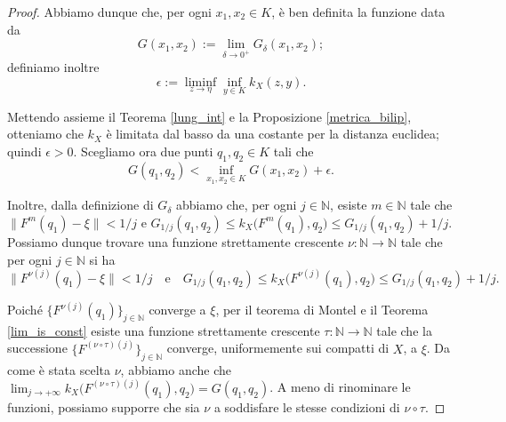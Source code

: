 \begin{proof}
    Abbiamo dunque che, per ogni $x_1,x_2 \in K$, è ben definita la funzione data da
    $$G(x_1,x_2):=\lim_{\delta\longrightarrow 0^+}G_\delta(x_1,x_2);$$
    definiamo inoltre
    $$\epsilon:=\liminf_{z \longrightarrow\eta}\inf_{y\in K}k_X(z,y).$$
    
    Mettendo assieme il Teorema \ref{lung_int} e la Proposizione \ref{metrica_bilip}, otteniamo che $k_X$ è limitata dal basso da una costante per la distanza euclidea; quindi $\epsilon>0$. Scegliamo ora due punti $q_1,q_2 \in K$ tali che
    $$G(q_1,q_2)<\inf_{x_1,x_2\in K}G(x_1,x_2)+\epsilon.$$
    
    Inoltre, dalla definizione di $G_{\delta}$ abbiamo che, per ogni $j\in\mathbb{N}$, esiste $m\in\mathbb{N}$ tale che $\|F^m(q_1)-\xi\|<1/j$ e $G_{1/j}(q_1,q_2) \le k_X\big(F^m(q_1),q_2\big) \le G_{1/j}(q_1,q_2)+1/j$. Possiamo dunque trovare una funzione strettamente crescente $\nu:\mathbb{N}\longrightarrow\mathbb{N}$ tale che per ogni $j\in\mathbb{N}$ si ha
    $$\|F^{\nu(j)}(q_1)-\xi\|<1/j \quad\text{e}\quad G_{1/j}(q_1,q_2) \le k_X\big(F^{\nu(j)}(q_1),q_2\big) \le G_{1/j}(q_1,q_2)+1/j.$$

    Poiché $\{F^{\nu(j)}(q_1)\}_{j\in\mathbb{N}}$ converge a $\xi$, per il teorema di Montel e il Teorema \ref{lim_is_const} esiste una funzione strettamente crescente $\tau:\mathbb{N}\longrightarrow\mathbb{N}$ tale che la successione $\{F^{(\nu\circ\tau)(j)}\}_{j\in\mathbb{N}}$ converge, uniformemente sui compatti di $X$, a $\xi$. Da come è stata scelta $\nu$, abbiamo anche che $\displaystyle\lim_{j\longrightarrow+\infty}k_X\big(F^{(\nu\circ\tau)(j)}(q_1),q_2\big)=G(q_1,q_2)$. A meno di rinominare le funzioni, possiamo supporre che sia $\nu$ a soddisfare le stesse condizioni di $\nu\circ\tau$.


\end{proof}

